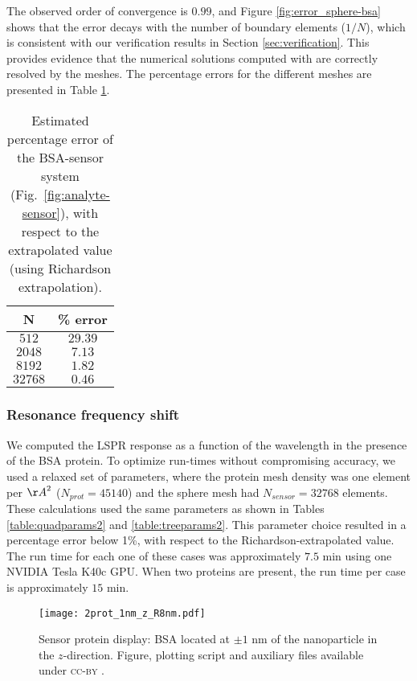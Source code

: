The observed order of convergence is $0.99$, and 
Figure \ref{fig:error_sphere-bsa} shows that the error decays with the number
of boundary elements ($1/N$), which is consistent with our verification 
results in Section \ref{sec:verification}. This provides evidence that the
numerical solutions computed with \pygbe are correctly resolved by the meshes.
The percentage errors for the different meshes are presented in Table \ref{table:err_bsa_sensor}.

\begin{table}%
    \centering
    \caption{\label{table:err_bsa_sensor} Estimated percentage error of the BSA-sensor system (Fig.~\ref{fig:analyte-sensor}), with respect to the extrapolated value (using Richardson extrapolation).} 
    \begin{tabular}{c c}
    \hline%
    N & \% error \\
    \hline%
     $512$ & $29.39$ \\
     $2048$ & $7.13$ \\
     $8192$ & $1.82$ \\
     $32768$ & $0.46$ \\
    \hline%
    \end{tabular}
\end{table}

\subsubsection{Resonance frequency shift} \label{sec:bsa_shift}

We computed the LSPR response as a function of the wavelength in the presence 
of the BSA protein. To optimize run-times without compromising accuracy, we used a relaxed
set of parameters, where the protein mesh density was one element per
${\AA}^2$ ($N_{prot}=45140$) and the sphere mesh had $N_{sensor}=32768$ elements. 
These calculations used the same parameters as shown in Tables \ref{table:quadparams2} and \ref{table:treeparams2}.
This parameter choice resulted in a percentage error below 1\%, with respect to the Richardson-extrapolated value.
The run time for each one of these cases was approximately $7.5$ min using one NVIDIA Tesla K40c GPU. 
When two proteins are present, the run time per case is approximately  $15$ min. 

\begin{center}
\begin{figure*}[t] %
   \centering
   \texttt{[image: 2prot\_1nm\_z\_R8nm.pdf]} 
   \caption{Sensor protein display: BSA located at $\pm 1$ nm of the 
            nanoparticle in the $z$-direction. Figure, plotting script and auxiliary files available under \textsc{cc-by} \cite{ClementiETal2018e}.}
   \label{fig:display_z}
\end{figure*}
\end{center}

